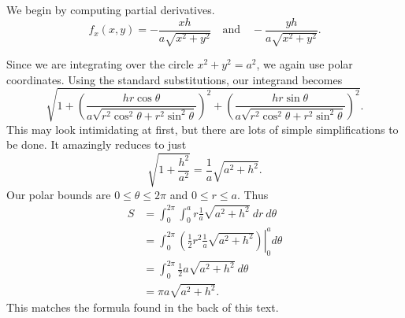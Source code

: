{We begin by computing partial derivatives. 
$$f_x(x,y) = -\frac{xh}{a\sqrt{x^2+y^2}}\quad \text{and}\quad -\frac{yh}{a\sqrt{x^2+y^2}}.$$

Since we are integrating over the circle $x^2+y^2=a^2$, we again use polar coordinates. Using the standard substitutions, our integrand becomes
$$\sqrt{1+ \left(\frac{hr\cos\theta}{a\sqrt{r^2\cos^2\theta+r^2\sin^2\theta}}\right)^2 + \left(\frac{hr\sin\theta}{a\sqrt{r^2\cos^2\theta+r^2\sin^2\theta}}\right)^2}.$$
This may look intimidating at first, but there are lots of simple simplifications to be done. It amazingly reduces to just
$$\sqrt{1+\frac{h^2}{a^2}} = \frac1a\sqrt{a^2+h^2}.$$
Our polar bounds are $0\leq\theta\leq2\pi$ and $0\leq r\leq a$. Thus
\begin{align*}
S &=	\int_0^{2\pi}\int_0^ar\frac1a\sqrt{a^2+h^2}\ dr\ d\theta\\
	&= \int_0^{2\pi} \left.\left(\frac12r^2\frac1a\sqrt{a^2+h^2}\right)\right|_0^ad\theta \\
	&=	\int_0^{2\pi} \frac12a\sqrt{a^2+h^2} \ d\theta\\
	&= \pi a\sqrt{a^2+h^2}.
\end{align*}
This matches the formula found in the back of this text.
}\\

